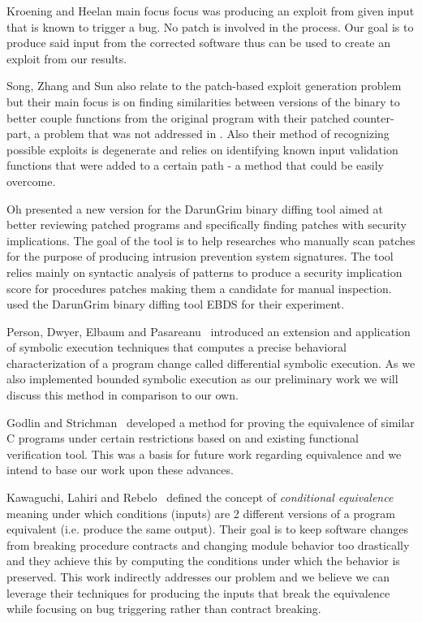 Kroening and Heelan \cite{AutoExploit} main focus focus was producing an exploit from given input that is known to trigger a bug. No patch is involved in the process. Our
goal is to produce said input from the corrected software thus \cite{AutoExploit} can be used to create an exploit from our results.

Song, Zhang and Sun \cite{AutoBinary} also relate to the patch-based exploit generation problem but their main focus is on finding similarities between versions of the binary to better couple functions from the original program with their patched counter-part, a problem that was not addressed in \cite{AutoPatch}. Also their method of recognizing possible exploits is degenerate and relies on identifying known input validation functions that were added to a certain path - a method that could be easily overcome.

Oh \cite{DarunGrim3} presented a new version for the DarunGrim binary diffing tool aimed at better reviewing patched programs and specifically finding patches with security implications. The goal of the tool is to help researches who manually scan patches for the purpose of producing intrusion prevention system signatures. The tool relies mainly on syntactic analysis of patterns to produce a security implication score for procedures patches making them a candidate for manual inspection. \cite{AutoPatch} used the DarunGrim binary diffing tool EBDS for their experiment.

Person, Dwyer, Elbaum and Pasareanu~\cite{DEP:FSE08} introduced an extension and
application of symbolic execution techniques that computes a
precise behavioral characterization of a program change called
differential symbolic execution. As we also implemented bounded
symbolic execution as our preliminary work we will discuss this
method in comparison to our own.

Godlin and Strichman~\cite{GS09} developed a
method for proving the equivalence of similar C programs under
certain restrictions based on and existing functional verification
tool. This was a basis for future work regarding equivalence and
we intend to base our work upon these advances.

Kawaguchi, Lahiri and Rebelo~\cite{LHKR:CAV12} defined the concept of
\textit{conditional equivalence} meaning under which conditions
(inputs) are 2 different versions of a program equivalent (i.e.
produce the same output). Their goal is to keep software changes
from breaking procedure contracts and changing module behavior too
drastically and they achieve this by computing the conditions
under which the behavior is preserved. This work indirectly
addresses our problem and we believe we can leverage their
techniques for producing the inputs that break the equivalence
while focusing on bug triggering rather than contract breaking.


